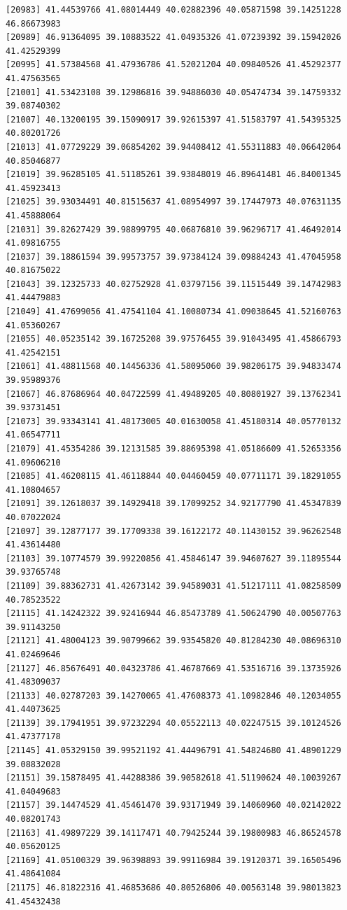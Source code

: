 \documentclass[
  letterpaper,
  DIV=11,
  numbers=noendperiod]{scrartcl}
\begin{document}
\begin{verbatim}
[20983] 41.44539766 41.08014449 40.02882396 40.05871598 39.14251228 46.86673983
[20989] 46.91364095 39.10883522 41.04935326 41.07239392 39.15942026 41.42529399
[20995] 41.57384568 41.47936786 41.52021204 40.09840526 41.45292377 41.47563565
[21001] 41.53423108 39.12986816 39.94886030 40.05474734 39.14759332 39.08740302
[21007] 40.13200195 39.15090917 39.92615397 41.51583797 41.54395325 40.80201726
[21013] 41.07729229 39.06854202 39.94408412 41.55311883 40.06642064 40.85046877
[21019] 39.96285105 41.51185261 39.93848019 46.89641481 46.84001345 41.45923413
[21025] 39.93034491 40.81515637 41.08954997 39.17447973 40.07631135 41.45888064
[21031] 39.82627429 39.98899795 40.06876810 39.96296717 41.46492014 41.09816755
[21037] 39.18861594 39.99573757 39.97384124 39.09884243 41.47045958 40.81675022
[21043] 39.12325733 40.02752928 41.03797156 39.11515449 39.14742983 41.44479883
[21049] 41.47699056 41.47541104 41.10080734 41.09038645 41.52160763 41.05360267
[21055] 40.05235142 39.16725208 39.97576455 39.91043495 41.45866793 41.42542151
[21061] 41.48811568 40.14456336 41.58095060 39.98206175 39.94833474 39.95989376
[21067] 46.87686964 40.04722599 41.49489205 40.80801927 39.13762341 39.93731451
[21073] 39.93343141 41.48173005 40.01630058 41.45180314 40.05770132 41.06547711
[21079] 41.45354286 39.12131585 39.88695398 41.05186609 41.52653356 41.09606210
[21085] 41.46208115 41.46118844 40.04460459 40.07711171 39.18291055 41.10804657
[21091] 39.12618037 39.14929418 39.17099252 34.92177790 41.45347839 40.07022024
[21097] 39.12877177 39.17709338 39.16122172 40.11430152 39.96262548 41.43614480
[21103] 39.10774579 39.99220856 41.45846147 39.94607627 39.11895544 39.93765748
[21109] 39.88362731 41.42673142 39.94589031 41.51217111 41.08258509 40.78523522
[21115] 41.14242322 39.92416944 46.85473789 41.50624790 40.00507763 39.91143250
[21121] 41.48004123 39.90799662 39.93545820 40.81284230 40.08696310 41.02469646
[21127] 46.85676491 40.04323786 41.46787669 41.53516716 39.13735926 41.48309037
[21133] 40.02787203 39.14270065 41.47608373 41.10982846 40.12034055 41.44073625
[21139] 39.17941951 39.97232294 40.05522113 40.02247515 39.10124526 41.47377178
[21145] 41.05329150 39.99521192 41.44496791 41.54824680 41.48901229 39.08832028
[21151] 39.15878495 41.44288386 39.90582618 41.51190624 40.10039267 41.04049683
[21157] 39.14474529 41.45461470 39.93171949 39.14060960 40.02142022 40.08201743
[21163] 41.49897229 39.14117471 40.79425244 39.19800983 46.86524578 40.05620125
[21169] 41.05100329 39.96398893 39.99116984 39.19120371 39.16505496 41.48641084
[21175] 46.81822316 41.46853686 40.80526806 40.00563148 39.98013823 41.45432438

\end{verbatim}
\end{document}
